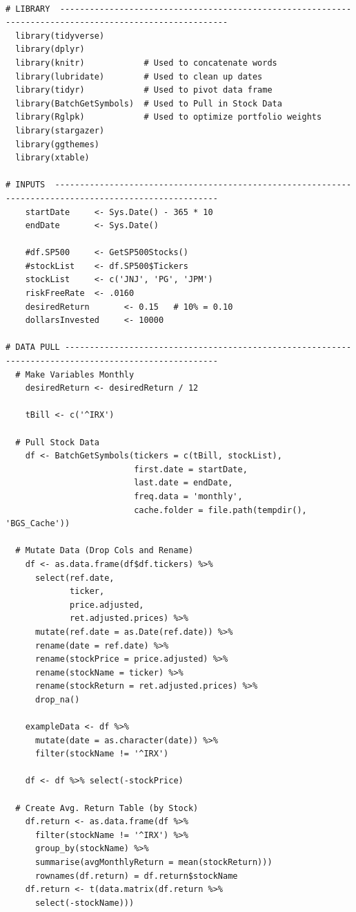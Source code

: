 \documentclass[12pt,english]{article}
\begin{document}
        \begin{lstlisting}

# LIBRARY  --------------------------------------------------------------------------------------------------------
  library(tidyverse)
  library(dplyr)
  library(knitr)            # Used to concatenate words
  library(lubridate)        # Used to clean up dates
  library(tidyr)            # Used to pivot data frame
  library(BatchGetSymbols)  # Used to Pull in Stock Data
  library(Rglpk)            # Used to optimize portfolio weights
  library(stargazer)
  library(ggthemes)
  library(xtable)  

# INPUTS  -------------------------------------------------------------------------------------------------------
    startDate     <- Sys.Date() - 365 * 10
    endDate       <- Sys.Date()
    
    #df.SP500     <- GetSP500Stocks()
    #stockList    <- df.SP500$Tickers
    stockList     <- c('JNJ', 'PG', 'JPM')
    riskFreeRate  <- .0160
    desiredReturn       <- 0.15   # 10% = 0.10
    dollarsInvested     <- 10000
  
# DATA PULL -----------------------------------------------------------------------------------------------------
  # Make Variables Monthly
    desiredReturn <- desiredReturn / 12

    tBill <- c('^IRX')
    
  # Pull Stock Data
    df <- BatchGetSymbols(tickers = c(tBill, stockList), 
                          first.date = startDate,
                          last.date = endDate, 
                          freq.data = 'monthly',
                          cache.folder = file.path(tempdir(), 'BGS_Cache'))
    
  # Mutate Data (Drop Cols and Rename)
    df <- as.data.frame(df$df.tickers) %>%
      select(ref.date,
             ticker,
             price.adjusted,
             ret.adjusted.prices) %>%
      mutate(ref.date = as.Date(ref.date)) %>%
      rename(date = ref.date) %>%
      rename(stockPrice = price.adjusted) %>%
      rename(stockName = ticker) %>%
      rename(stockReturn = ret.adjusted.prices) %>%
      drop_na()
    
    exampleData <- df %>%
      mutate(date = as.character(date)) %>%
      filter(stockName != '^IRX')
    
    df <- df %>% select(-stockPrice)
    
  # Create Avg. Return Table (by Stock)
    df.return <- as.data.frame(df %>%
      filter(stockName != '^IRX') %>%
      group_by(stockName) %>%
      summarise(avgMonthlyReturn = mean(stockReturn)))
      rownames(df.return) = df.return$stockName
    df.return <- t(data.matrix(df.return %>%
      select(-stockName)))
    

\end{lstlisting}
\end{document}
